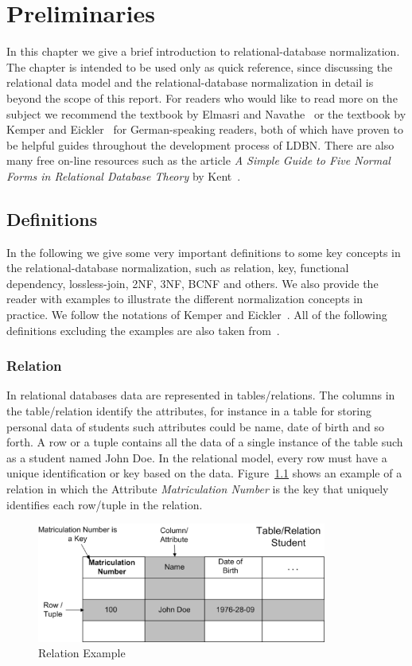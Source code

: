 \chapter{Preliminaries}
\label{chap:preliminaries}
In this chapter we give a brief introduction to relational-database
normalization. The chapter is intended to be used only as quick reference,
since discussing the relational data model and the relational-database normalization
in detail is beyond the scope of this report. For readers who would like to read
more on the subject we recommend the textbook by Elmasri and Navathe~\cite{bdb1} or
the textbook by Kemper and Eickler~\cite{bdb2} for German-speaking readers, both of which have 
proven to be helpful guides throughout the development process of LDBN. There are also
many free on-line resources such as the article 
\textit{A Simple Guide to Five Normal Forms in Relational Database Theory}
by Kent~\cite{p7}.  

\section{Definitions}
In the following we give some very important definitions to some key
concepts in the relational-database
normalization, such as relation, key, functional dependency, lossless-join, 
2NF, 3NF, BCNF and others. We also provide the reader with examples to illustrate the 
different normalization concepts in practice. We follow the notations 
of Kemper and Eickler~\cite{bdb2}.
All of the following definitions excluding the examples are also taken from~\cite[Chapter 6]{bdb2}.  

\subsection{Relation}
In relational databases data are represented in tables/relations. 
The columns in the table/relation identify the attributes, for instance
in a table for storing personal data of students such attributes could be
name, date of birth and so forth. A row or a tuple contains all the data of a single 
instance of the table such as a student named John Doe.
In the relational model, every row must have a unique identification or 
key based on the data. Figure~\ref{fig:rmodel} shows an example of a relation in which 
the Attribute \textit{Matriculation Number} is the key that uniquely identifies each row/tuple in the relation.

\begin{figure}[h]
  \begin{center}
    \includegraphics[width=0.85\textwidth]{./img/rmodel01.png}
    \caption{Relation Example}
    \label{fig:rmodel}
  \end{center}
\end{figure}

